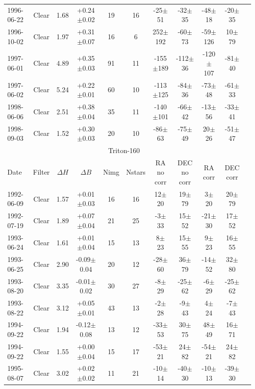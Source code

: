 \documentclass[12pt,a4paper]{report}
\begin{document}
\begin{landscape}
\begin{longtable}{|l|c|c|c|c|c|c|c|c|c|c|}
1996-06-22 & Clear & 1.68 & +0.24$\pm$0.02 &  19 &  16 &  -25$\pm$ 51 &  -32$\pm$ 35 &  -48$\pm$ 18 &  -20$\pm$ 35 \\ 
1996-10-02 & Clear & 1.97 & +0.31$\pm$0.07 &  16 &   6 &  252$\pm$192 &  -60$\pm$ 73 &  -59$\pm$126 &   10$\pm$ 79 \\ 
1997-06-01 & Clear & 4.89 & +0.35$\pm$0.03 &  91 &  11 & -155$\pm$189 & -112$\pm$ 36 & -120$\pm$107 &  -81$\pm$ 40 \\ 
1997-06-02 & Clear & 5.24 & +0.22$\pm$0.01 &  60 &  10 & -113$\pm$125 &  -84$\pm$ 36 &  -73$\pm$ 48 &  -61$\pm$ 33 \\ 
1998-06-06 & Clear & 2.51 & +0.38$\pm$0.04 &  35 &  11 & -140$\pm$101 &  -66$\pm$ 42 &  -13$\pm$ 56 &  -33$\pm$ 41 \\ 
1998-09-03 & Clear & 1.52 & +0.30$\pm$0.03 &  20 &  10 &  -86$\pm$ 63 &  -75$\pm$ 49 &   20$\pm$ 26 &  -51$\pm$ 47 \\ 
\hline
\multicolumn{10}{|c|}{Triton-160}\\
Date & Filter & $\Delta H$ & $\Delta B$ & Nimg & Nstars & RA no corr & DEC no corr & RA corr & DEC corr \\
\hline
1992-06-09 & Clear & 1.57 & +0.01$\pm$0.03 &  16 &  16 &   12$\pm$ 20 &   19$\pm$ 79 &    3$\pm$ 20 &   20$\pm$ 79 \\ 
1992-07-19 & Clear & 1.89 & +0.07$\pm$0.04 &  21 &  25 &   -3$\pm$ 33 &   15$\pm$ 52 &  -21$\pm$ 30 &   17$\pm$ 52 \\ 
1993-06-24 & Clear & 1.61 & +0.01$\pm$0.04 &  15 &  13 &    8$\pm$ 23 &   15$\pm$ 55 &    9$\pm$ 23 &   16$\pm$ 55 \\ 
1993-06-25 & Clear & 2.90 & -0.09$\pm$0.04 &  20 &  12 &  -28$\pm$ 60 &   36$\pm$ 79 &  -14$\pm$ 52 &   32$\pm$ 80 \\ 
1993-08-20 & Clear & 3.35 & -0.01$\pm$0.02 &  30 &  27 &   -8$\pm$ 29 &  -25$\pm$ 62 &   -6$\pm$ 29 &  -25$\pm$ 62 \\ 
1993-08-22 & Clear & 3.12 & +0.05$\pm$0.01 &  43 &  13 &   -2$\pm$ 28 &   -9$\pm$ 43 &    4$\pm$ 24 &   -7$\pm$ 43 \\ 
1994-09-22 & Clear & 1.94 & -0.12$\pm$0.08 &  13 &  12 &  -33$\pm$ 53 &   30$\pm$ 75 &   48$\pm$ 49 &   16$\pm$ 71 \\ 
1994-09-22 & Clear & 1.55 & +0.00$\pm$0.04 &  15 &  17 &  -53$\pm$ 21 &   24$\pm$ 82 &  -54$\pm$ 21 &   24$\pm$ 82 \\ 
1995-08-07 & Clear & 3.02 & +0.02$\pm$0.02 &  11 &  21 &  -10$\pm$ 14 &  -40$\pm$ 30 &  -10$\pm$ 13 &  -39$\pm$ 30 \\ 

\end{longtable}
\end{landscape}
\end{document}
